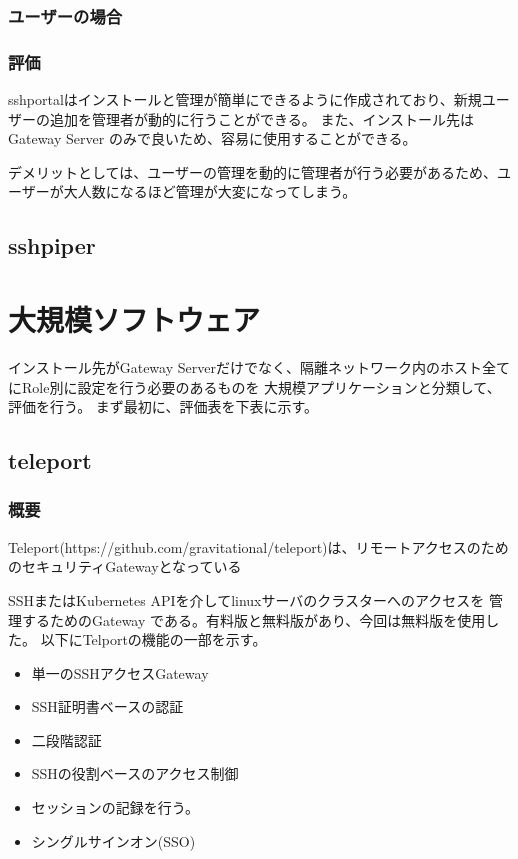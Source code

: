 \documentclass[12pt,a4paper,titlepage]{jreport}
\begin{document}
\subsection*{ユーザーの場合}


\subsection*{評価}
sshportalはインストールと管理が簡単にできるように作成されており、新規ユーザーの追加を管理者が動的に行うことができる。
また、インストール先はGateway Server のみで良いため、容易に使用することができる。
\par デメリットとしては、ユーザーの管理を動的に管理者が行う必要があるため、ユーザーが大人数になるほど管理が大変になってしまう。


\section{sshpiper}




\chapter{大規模ソフトウェア}
インストール先がGateway Serverだけでなく、隔離ネットワーク内のホスト全てにRole別に設定を行う必要のあるものを
大規模アプリケーションと分類して、評価を行う。
まず最初に、評価表を下表に示す。


\section{teleport}

\subsection*{概要}
Teleport(https://github.com/gravitational/teleport)は、リモートアクセスのためのセキュリティGatewayとなっている


SSHまたはKubernetes APIを介してlinuxサーバのクラスターへのアクセスを
管理するためのGateway である。有料版と無料版があり、今回は無料版を使用した。
以下にTelportの機能の一部を示す。

\begin{itemize}
    \item 単一のSSHアクセスGateway
    \item SSH証明書ベースの認証
    \item 二段階認証
    \item SSHの役割ベースのアクセス制御
    \item セッションの記録を行う。
    \item シングルサインオン(SSO)
\end{itemize}
\end{document}
